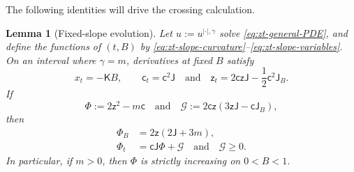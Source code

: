 \documentclass[10pt]{amsart}
\newtheorem{lemma}[lemma]{Lemma}
\theoremstyle{definition}
\theoremstyle{remark}
\numberwithin{equation}{section}
\newcommand{\1}{\mathbf 1}
\newcommand{\cG}{\mathcal G}
\begin{document}
The following identities will drive the crossing calculation.

\begin{lemma}[Fixed-slope evolution]
\label{lem:zt-fixed-slope}
Let $u:=u^{|\cdot|,\gamma}$ solve \eqref{eq:zt-general-PDE}, and define the functions of $(t,B)$ by \eqref{eq:zt-slope-curvature}--\eqref{eq:zt-slope-variables}. On an interval where $\gamma=m$, derivatives at fixed $B$ satisfy
\begin{equation}
 x_t=-\mathsf K B,\qquad \mathsf c_t=\mathsf c^2\mathsf J
 \quad\text{and}\quad \mathsf z_t=2\mathsf c\mathsf z\mathsf J-\frac12\mathsf c^2\mathsf J_B.
 \label{eq:zt-fixed-B-evolution}
\end{equation}
If
\begin{equation}
 \Phi:=2\mathsf z^2-m\mathsf c\quad\text{and}\quad
 \cG:=2\mathsf c\mathsf z(3\mathsf z\mathsf J-\mathsf c\mathsf J_B),
 \label{eq:zt-Phi-G-def}
\end{equation}
then
\begin{align}
 \Phi_B&=2\mathsf z(2\mathsf J+3m),                                             \label{eq:zt-Phi-B}\\
 \Phi_t&=\mathsf c\mathsf J\Phi+\cG\quad\text{and}\quad \cG\geq0.           \label{eq:zt-Phi-time}
\end{align}
In particular, if $m>0$, then $\Phi$ is strictly increasing on $0<B<1$.
\end{lemma}
\end{document}
